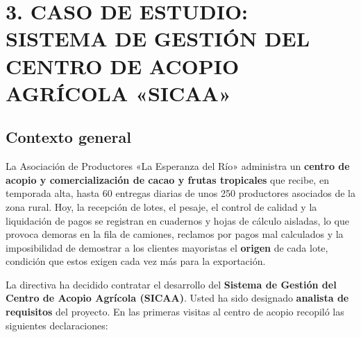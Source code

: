 \documentclass[11pt]{article}
\begin{document}
\newpage
\section*{\textcolor{utegreendk}{3. CASO DE ESTUDIO: SISTEMA DE GESTIÓN DEL CENTRO DE ACOPIO AGRÍCOLA «SICAA»}}

\subsection*{Contexto general}

La Asociación de Productores «La Esperanza del Río» administra un \textbf{centro de acopio y comercialización de cacao y frutas tropicales} que recibe, en temporada alta, hasta 60 entregas diarias de unos 250 productores asociados de la zona rural. Hoy, la recepción de lotes, el pesaje, el control de calidad y la liquidación de pagos se registran en cuadernos y hojas de cálculo aisladas, lo que provoca demoras en la fila de camiones, reclamos por pagos mal calculados y la imposibilidad de demostrar a los clientes mayoristas el \textbf{origen} de cada lote, condición que estos exigen cada vez más para la exportación.

La directiva ha decidido contratar el desarrollo del \textbf{Sistema de Gestión del Centro de Acopio Agrícola (SICAA)}. Usted ha sido designado \textbf{analista de requisitos} del proyecto. En las primeras visitas al centro de acopio recopiló las siguientes declaraciones:
\end{document}
